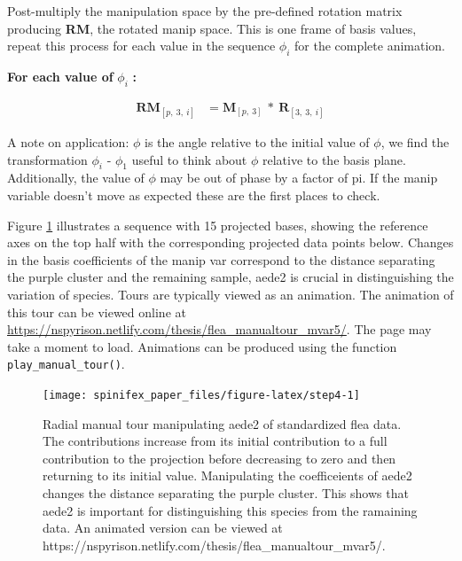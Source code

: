 Post-multiply the manipulation space by the pre-defined rotation matrix
producing \textbf{RM}, the rotated manip space. This is one frame of
basis values, repeat this process for each value in the sequence
\(\phi_i\) for the complete animation.

\textbf{For each value of } \(\phi_i\) \textbf{:}

\begin{align*}
  \textbf{RM}_{[p,~3,~i]} &= \textbf{M}_{[p,~3]} ~*~ \textbf{R}_{[3,~3,~i]} 
\end{align*}

A note on application: \(\phi\) is the angle relative to the initial
value of \(\phi\), we find the transformation \(\phi_i\) - \(\phi_1\)
useful to think about \(\phi\) relative to the basis plane.
Additionally, the value of \(\phi\) may be out of phase by a factor of
pi. If the manip variable doesn't move as expected these are the first
places to check.

Figure \ref{fig:step4} illustrates a sequence with 15 projected bases,
showing the reference axes on the top half with the corresponding
projected data points below. Changes in the basis coefficients of the
manip var correspond to the distance separating the purple cluster and
the remaining sample, aede2 is crucial in distinguishing the variation
of species. Tours are typically viewed as an animation. The animation of
this tour can be viewed online at
\url{https://nspyrison.netlify.com/thesis/flea_manualtour_mvar5/}. The
page may take a moment to load. Animations can be produced using the
function \texttt{play\_manual\_tour()}.

\begin{Schunk}
\begin{figure}

{\centering \texttt{[image: spinifex\_paper\_files/figure-latex/step4-1]} 

}

\caption[Radial manual tour manipulating aede2 of standardized flea data]{Radial manual tour manipulating aede2 of standardized flea data.  The contributions increase from its initial contribution to a full contribution to the projection before decreasing to zero and then returning to its initial value. Manipulating the coefficeients of aede2 changes the distance separating the purple cluster. This shows that aede2 is important for distinguishing this species from the ramaining data. An animated version can be viewed at  https://nspyrison.netlify.com/thesis/flea\_manualtour\_mvar5/.}\label{fig:step4}
\end{figure}
\end{Schunk}

